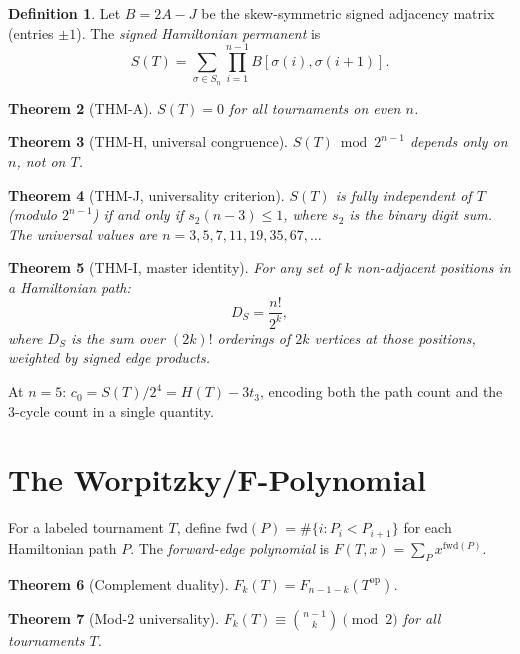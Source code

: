 \documentclass[12pt,reqno]{amsart}
\theoremstyle{plain}
\newtheorem{theorem}{Theorem}[section]
\theoremstyle{definition}
\newtheorem{definition}[theorem]{Definition}
\theoremstyle{remark}
\begin{document}
\begin{definition}
Let $B = 2A - J$ be the skew-symmetric signed adjacency matrix (entries $\pm 1$).
The \emph{signed Hamiltonian permanent} is
\[
S(T) = \sum_{\sigma \in S_n} \prod_{i=1}^{n-1} B[\sigma(i), \sigma(i+1)].
\]
\end{definition}

\begin{theorem}[THM-A]
$S(T) = 0$ for all tournaments on even $n$.
\end{theorem}

\begin{theorem}[THM-H, universal congruence]
$S(T) \bmod 2^{n-1}$ depends only on $n$, not on $T$.
\end{theorem}

\begin{theorem}[THM-J, universality criterion]
$S(T)$ is fully independent of $T$ (modulo $2^{n-1}$) if and only if
$s_2(n-3) \leq 1$, where $s_2$ is the binary digit sum. The universal values
are $n = 3, 5, 7, 11, 19, 35, 67, \ldots$
\end{theorem}

\begin{theorem}[THM-I, master identity]
For any set of $k$ non-adjacent positions in a Hamiltonian path:
\[
D_S = \frac{n!}{2^k},
\]
where $D_S$ is the sum over $(2k)!$ orderings of $2k$ vertices at those
positions, weighted by signed edge products.
\end{theorem}

At $n = 5$: $c_0 = S(T)/2^4 = H(T) - 3t_3$, encoding both the path count
and the 3-cycle count in a single quantity.

\section{The Worpitzky/F-Polynomial}\label{sec:fpoly}

For a labeled tournament $T$, define $\mathrm{fwd}(P) = \#\{i : P_i < P_{i+1}\}$
for each Hamiltonian path $P$. The \emph{forward-edge polynomial} is
$F(T, x) = \sum_P x^{\mathrm{fwd}(P)}$.

\begin{theorem}[Complement duality]
$F_k(T) = F_{n-1-k}(T^{\mathrm{op}})$.
\end{theorem}

\begin{theorem}[Mod-2 universality]
$F_k(T) \equiv \binom{n-1}{k} \pmod{2}$ for all tournaments $T$.
\end{theorem}
\end{document}

